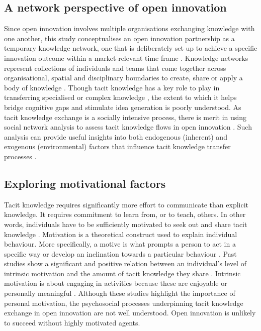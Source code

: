 \subsection{A network perspective of open innovation}

Since open innovation involves multiple organisations exchanging knowledge with one another, this study conceptualises an open innovation partnership as a temporary knowledge network, one that is deliberately set up to achieve a specific innovation outcome within a market-relevant time frame \citep{perez2013temporary,cococcioni2014exploring}. Knowledge networks represent collections of individuals and teams that come together across organisational, spatial and disciplinary boundaries to create, share or apply a body of knowledge \citep{pugh2013designing}. Though tacit knowledge has a key role to play in transferring specialised or complex knowledge \citep{davenport1998working,sternberg1999tacit,johnson2002all,lee2007tacit,tell2017managing}, the extent to which it helps bridge cognitive gaps and stimulate idea generation is poorly understood. As tacit knowledge exchange is a socially intensive process, there is merit in using social network analysis to assess tacit knowledge flows in open innovation \citep{leonard1998role,busch2000graphically,zhu2007social}. Such analysis can provide useful insights into both endogenous (inherent) and exogenous (environmental) factors that influence tacit knowledge transfer processes \citep{kolleck2013social,tortoriello2015social}. 

\subsection{Exploring motivational factors}

Tacit knowledge requires significantly more effort to communicate than explicit knowledge. It requires commitment to learn from, or to teach, others. In other words, individuals have to be sufficiently motivated to seek out and share tacit knowledge \citep{leonard1998role}. Motivation is a theoretical construct used to explain individual behaviour. More specifically, a motive is what prompts a person to act in a specific way or develop an inclination towards a particular behaviour \citep{pardee1990motivation}. Past studies show a significant and positive relation between an individual's level of intrinsic motivation and the amount of tacit knowledge they share \citep[e.g.][]{osterloh2000motivation,kaser2001knowledge,smith2001role}. Intrinsic motivation is about engaging in activities because these are enjoyable or personally meaningful \citep{ryan2000intrinsic}. Although these studies highlight the importance of personal motivation, the psychosocial processes underpinning tacit knowledge exchange in open innovation are not well understood. Open innovation is unlikely to succeed without highly motivated agents.

